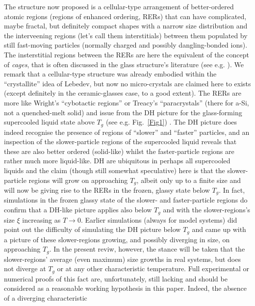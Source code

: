 \documentclass[10pt]{article}
\begin{document}
The structure now proposed is a cellular-type arrangement of better-ordered 
atomic regions (regions of enhanced ordering, RERs) that can have complicated, 
maybe fractal, but definitely compact shapes with a narrow size distribution and 
the interveening regions (let's call them interstitials) 
between them populated by still fast-moving particles (normally charged and
possibly dangling-bonded ions). The insterstitial regions between the RERs are 
here the equivalent of the concept of {\it cages}, that is often discussed in the 
glass structure's literature (see e.g. \cite{Ber2011}). We remark that a cellular-type 
structure was already embodied within the ``crystallite'' idea of Lebedev, but 
now no micro-crystals are claimed here to exists (except definitely in the 
ceramic-glasses case, to a good extent). The RERs are more like Wright's 
``cybotactic regions'' \cite{Wri2014} or Treacy's ``paracrystals'' \cite{Tre2012} 
(there for a-Si, not a quenched-melt solid) and issue from the DH picture for
the glass-forming supercooled liquid state above $T_g$ (see e.g. 
Fig.~\ref{Fig1}) \cite{Ber2011,Hur1995,Sil1999,Edi2000}. The DH picture does
indeed recognise the presence of regions of ``slower'' and ``faster'' particles,
and an inspection of the slower-particle regions of the supercooled liquid 
reveals that these are also better ordered (solid-like) whilst the 
faster-particle regions are rather much more liquid-like. DH are ubiquitous in 
perhaps all supercooled liquids \cite{Edi2000} and the claim (though still 
somewhat speculative) here is that the slower-particle regions will grow on 
approaching $T_g$, albeit only up to a finite size and will now be giving rise 
to the RERs in the frozen, glassy state below $T_g$. In fact, simulations in 
the frozen glassy state of the slower- and faster-particle regions do confirm
that a DH-like picture applies also below $T_g$ \cite{Vol2005} and with the 
slower-regions's size $\xi$ increasing as $T\to 0$. Earlier simulations (always for
model systems) \cite{Don1999} did point out the difficulty of simulating the DH 
picture below $T_g$ and came up with a picture of these slower-regions growing, 
and possibly diverging in size, on approaching $T_g$. In the present reviw, 
however, the stance will be taken that the slower-regions' average (even 
maximum) size growths in real systems, but does not diverge at $T_g$ or at any 
other characteristic temperature. Full experimental or numerical proofs of this 
fact are, unfortunately, still lacking and should be considered as a reasonable 
working hypothesis in this paper. Indeed, the absence of a diverging characteristic
\end{document}
